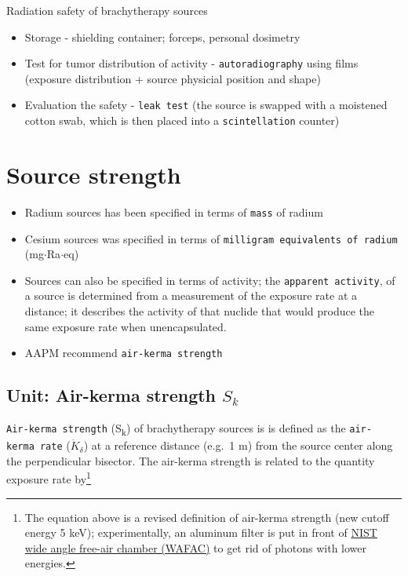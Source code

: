 \documentclass[]{book}
\providecommand{\tightlist}{%
  \setlength{\itemsep}{0pt}\setlength{\parskip}{0pt}}
\let\rmarkdownfootnote\footnote%
\def\footnote{\protect\rmarkdownfootnote}
\theoremstyle{definition}
\theoremstyle{definition}
\theoremstyle{definition}
\theoremstyle{remark}
\begin{document}
Radiation safety of brachytherapy sources

\begin{itemize}
\tightlist
\item
  Storage - shielding container; forceps, personal dosimetry
\item
  Test for tumor distribution of activity - \texttt{autoradiography}
  using films (exposure distribution + source physicial position and
  shape)
\item
  Evaluation the safety - \texttt{leak\ test} (the source is swapped
  with a moistened cotton swab, which is then placed into a
  \texttt{scintellation} counter)
\end{itemize}

\section{Source strength}\label{source-strength}

\begin{itemize}
\tightlist
\item
  Radium sources has been specified in terms of \texttt{mass} of radium
\item
  Cesium sources was specified in terms of
  \texttt{milligram\ equivalents\ of\ radium} (mg\(\cdot\)Ra\(\cdot\)eq)
\item
  Sources can also be specified in terms of activity; the
  \texttt{apparent\ activity}, of a source is determined from a
  measurement of the exposure rate at a distance; it describes the
  activity of that nuclide that would produce the same exposure rate
  when unencapsulated.
\item
  AAPM recommend \texttt{air-kerma\ strength}
\end{itemize}

\subsection{\texorpdfstring{Unit: Air-kerma strength
\(S_k\)}{Unit: Air-kerma strength S\_k}}\label{sk}

\texttt{Air-kerma\ strength} (S\textsubscript{k}) of brachytherapy
sources is is defined as the \texttt{air-kerma\ rate}
(\(\dot{K}_{\delta}\)) at a reference distance (e.g.~1 m) from the
source center along the perpendicular bisector. The air-kerma strength
is related to the quantity exposure rate by\footnote{The equation above
  is a revised definition of air-kerma strength (new cutoff energy 5
  keV); experimentally, an aluminum filter is put in front of
  \href{https://www.nist.gov/programs-projects/calibration-low-energy-photon-brachytherapy-sources}{NIST
  wide angle free-air chamber (WAFAC)} to get rid of photons with lower
  energies.}
\end{document}
